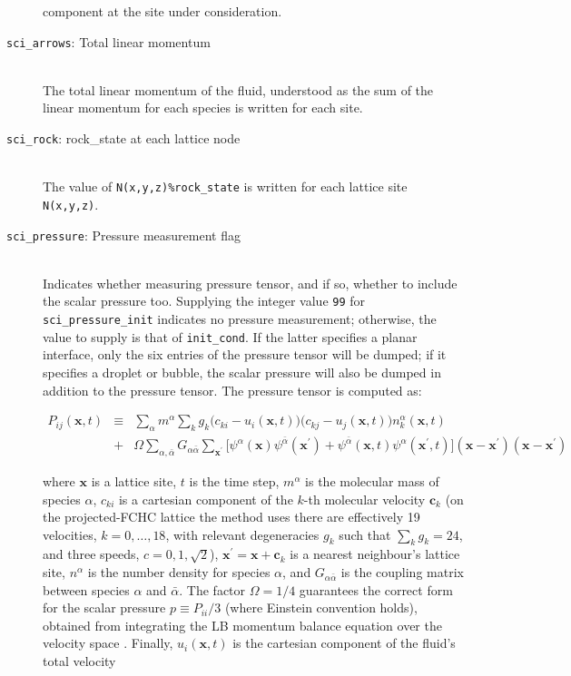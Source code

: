 \documentclass[a4paper]{article}
\begin{document}
\begin{description}
	component at the site under consideration.
\item[{\tt sci\_arrows}: Total linear momentum]\ \\
	The total linear momentum of the fluid, understood as the sum
	of the linear momentum for each species is written for each
	site.
\item[{\tt sci\_rock}: rock\_state at each lattice node]\ \\
	The value of \texttt{N(x,y,z)\%rock\_state} is written for each lattice
        site \texttt{N(x,y,z)}.
\item[{\tt sci\_pressure}: Pressure measurement flag]\ \\
	Indicates whether measuring pressure tensor, and if so,
	whether to include the scalar pressure too. Supplying the
	integer value {\tt 99} for {\tt sci\_pressure\_init} indicates
	no pressure measurement; otherwise, the value to supply is
	that of {\tt init\_cond}. If the latter specifies a planar
	interface, only the six entries of the pressure tensor will be
	dumped; if it specifies a droplet or bubble, the scalar
	pressure will also be dumped in addition to the pressure
	tensor. The pressure tensor is computed as:

	\begin{eqnarray}
		P_{ij}(\mathbf{x},t)
  		&\equiv&
  		\sum_{\alpha} m^\alpha
		\sum_k g_k
		\Big(c_{ki}-u_{i}(\mathbf{x},t)\Big)
		\Big(c_{kj}-u_{j}(\mathbf{x},t)\Big)
  		n_k^\alpha(\mathbf{x},t)		
							\nonumber\\
  		&+&
		\Omega \sum_{\alpha,\bar{\alpha}}
		G_{\alpha\bar{\alpha}}  
		\sum_{\mathbf{x}^\prime} 
		\Big[\psi^\alpha(\mathbf{x})
		\psi^{\bar{\alpha}}(\mathbf{x}^\prime) 
		+ 
		\psi^{\bar{\alpha}}(\mathbf{x},t)
		\psi^{\alpha}(\mathbf{x}^\prime,t)\Big] 
  		(\mathbf{x}-\mathbf{x}^\prime)
		(\mathbf{x}-\mathbf{x}^\prime)
	\end{eqnarray}

  	\noindent where $\mathbf{x}$ is a lattice site, $t$ is the
  	time step, $m^\alpha$ is the molecular mass of species
  	$\alpha$, $c_{ki}$ is a cartesian component of the $k$-th
  	molecular velocity $\mathbf{c}_k$  (on the projected-FCHC
  	lattice the method uses there are effectively 19 velocities,
  	$k=0,\ldots,18$, with relevant degeneracies $g_k$ such that 
  	$\sum_k g_k = 24$, and three speeds, $c=0,1,\sqrt{2}$), 
  	$\mathbf{x}^\prime = \mathbf{x} + \mathbf{c}_k$ is a nearest
  	neighbour's lattice site, $n^\alpha$ is the number density for
  	species $\alpha$, and $G_{\alpha\bar{\alpha}}$ is the coupling matrix
  	between species $\alpha$ and $\bar{\alpha}$. The factor
  	$\Omega = 1/4$ guarantees the correct form for the scalar
  	pressure $p\equiv{}P_{ii}/3$ (where Einstein convention
  	holds), obtained from integrating the LB momentum balance
  	equation over the velocity space \cite{NGS}. Finally,
  	$u_{i}(\mathbf{x},t)$ is the cartesian component of the
  	fluid's total velocity


\end{description}
\end{document}
